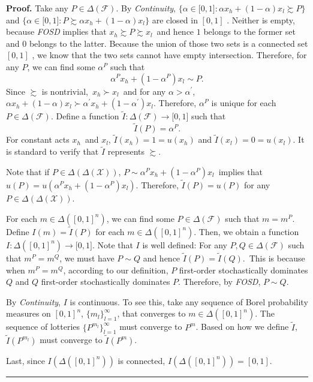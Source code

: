\documentclass[12pt, notitlepage]{article}
\newenvironment{proof}[1][Proof]{\noindent\textbf{#1.} }{\ \rule{0.5em}{0.5em}}
\begin{document}
\begin{proof}
{Take any $P\in \Delta (\mathcal{F})$. By \textit{Continuity}, $\{\alpha \in
\lbrack 0,1]:\alpha x_{h}+(1-\alpha )x_{l}\succsim P\}$ and $\{\alpha \in
\lbrack 0,1]:P\succsim \alpha x_{h}+(1-\alpha )x_{l}\}$ are closed in $[0,1]$%
. Neither is empty, because \textit{FOSD} implies that} $x_{h}\succsim
P\succsim x_{l}${\ and hence $1$ belongs to the former set and $0$ belongs
to the latter. Because the union of those two sets is a connected set $[0,1]$%
, we know that the two sets cannot have empty intersection. Therefore, for
any $P$, we can find some $\alpha ^{P}$ such that%
\begin{equation*}
\alpha ^{P}x_{h}+(1-\alpha ^{P})x_{l}\sim P.
\end{equation*}%
Since }$\succsim $ is nontrivial,{\ }$x_{h}\succ x_{l}${\ and for any $%
\alpha >\alpha ^{\prime }$, $\alpha x_{h}+(1-\alpha )x_{l}\succ \alpha
^{\prime }x_{h}+(1-\alpha ^{\prime })$}$x_{l}${. Therefore, $\alpha ^{P}$ is
unique for each $P\in \Delta (\mathcal{F})$. Define a function $\tilde{I}%
:\Delta (\mathcal{F})\rightarrow \lbrack 0,1]$ such that%
\begin{equation*}
\tilde{I}(P)=\alpha ^{P}.
\end{equation*}%
For constant acts }$x_{h}${\ and }$x_{l}${, $\tilde{I}(x_{h})=1=u(x_{h})$
and $\tilde{I}(x_{l})=0=u(x_{l})$. It is standard to verify that $\tilde{I}$
represents $\succsim $.}

{Note that if $P\in \Delta (\Delta (\mathcal{X}))$, $P\sim \alpha
^{P}x_{h}+(1-\alpha ^{P})$}$x_{l}${\ implies that $u(P)=u(\alpha
^{P}x_{h}+(1-\alpha ^{P})x_{l})$. Therefore, }$\tilde{I}(P)=u(P)$ for any {$%
P\in \Delta (\Delta (\mathcal{X}))$}.

{For each }$m\in \Delta ([0,1]^{n})${, we can find some $P\in \Delta (%
\mathcal{F})$ }such that $m=m^{P}$. Define $I(m)=\tilde{I}(P)$ for each $%
m\in \Delta ([0,1]^{n})$. Then, we obtain a function $I:\Delta
([0,1]^{n})\rightarrow \lbrack 0,1]${. Note that $I$ is well defined: For
any $P,Q\in \Delta (\mathcal{F})$ such that $m^{P}=m^{Q}$, we must have $%
P\sim Q$ and hence }$\tilde{I}(P)=\tilde{I}(Q)$.{\ This is because when $%
m^{P}=m^{Q}$, according to our definition, $P$ first-order stochastically
dominates $Q$ and $Q$ first-order stochastically dominates $P$. Therefore,
by \textit{FOSD}, $P\sim Q$.}

{By \textit{Continuity}, $I$ is continuous. To see this, take any sequence
of Borel probability measures on }$[0,1]^{n}$, $\{m_{l}\}_{l=1}^{\infty }$,
that converges to $m\in \Delta ([0,1]^{n})$. The sequence of lotteries $%
\{P^{m_{l}}\}_{l=1}^{\infty }$ must converge to $P^{m}$. Based on how we
define $\tilde{I}$, $\tilde{I}(P^{m_{l}})$ must converge to $\tilde{I}%
(P^{m}) $.

Last, {since $I(\Delta ([0,1]^{n}))$ is connected, $I(\Delta
([0,1]^{n}))=[0,1]$.}
\end{proof}
\end{document}
